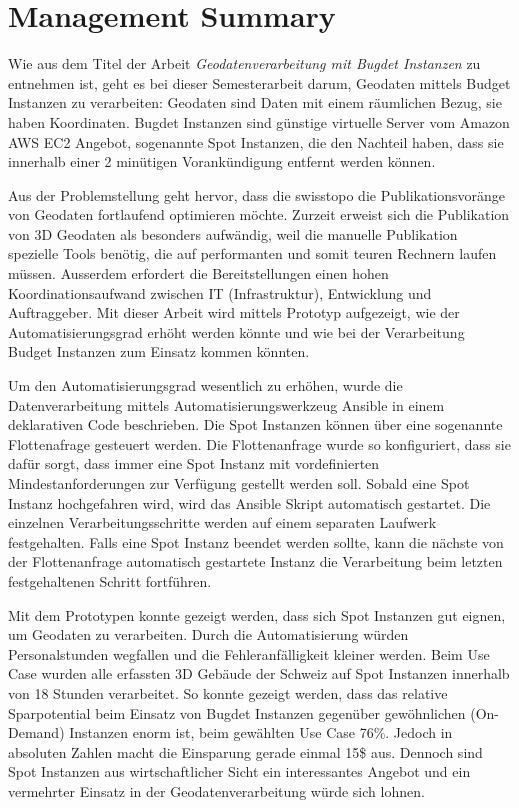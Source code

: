 \section{Management Summary}
Wie aus dem Titel der Arbeit \emph{Geodatenverarbeitung mit Bugdet Instanzen} zu entnehmen ist, geht es bei dieser Semesterarbeit darum, Geodaten mittels Budget Instanzen zu verarbeiten: Geodaten sind Daten mit einem räumlichen Bezug, sie haben Koordinaten. Bugdet Instanzen sind günstige virtuelle Server vom Amazon AWS EC2 Angebot, sogenannte Spot Instanzen, die den Nachteil haben, dass sie innerhalb einer 2 minütigen Vorankündigung entfernt werden können.

Aus der Problemstellung geht hervor, dass die swisstopo die Publikationsvoränge von Geodaten fortlaufend optimieren möchte. Zurzeit erweist sich die Publikation von 3D Geodaten als besonders aufwändig, weil die manuelle Publikation spezielle Tools benötig, die auf performanten und somit teuren Rechnern laufen müssen. Ausserdem erfordert die Bereitstellungen einen hohen Koordinationsaufwand zwischen IT (Infrastruktur), Entwicklung und Auftraggeber.
Mit dieser Arbeit wird mittels Prototyp aufgezeigt, wie der Automatisierungsgrad erhöht werden könnte und wie bei der Verarbeitung Budget Instanzen zum Einsatz kommen könnten.

Um den Automatisierungsgrad wesentlich zu erhöhen, wurde die Datenverarbeitung mittels Automatisierungswerkzeug Ansible in einem deklarativen Code beschrieben. Die Spot Instanzen können über eine sogenannte Flottenafrage gesteuert werden. Die Flottenanfrage wurde so konfiguriert, dass sie dafür sorgt, dass immer eine Spot Instanz mit vordefinierten Mindestanforderungen zur Verfügung gestellt werden soll. Sobald eine Spot Instanz hochgefahren wird, wird das Ansible Skript automatisch gestartet.
Die einzelnen Verarbeitungsschritte werden auf einem separaten Laufwerk festgehalten. Falls eine Spot Instanz beendet werden sollte, kann die nächste von der Flottenanfrage automatisch gestartete Instanz die Verarbeitung beim letzten festgehaltenen Schritt fortführen.

Mit dem Prototypen konnte gezeigt werden, dass sich Spot Instanzen gut eignen, um Geodaten zu verarbeiten. Durch die Automatisierung würden Personalstunden wegfallen und die Fehleranfälligkeit kleiner werden. Beim Use Case wurden alle erfassten 3D Gebäude der Schweiz auf Spot Instanzen innerhalb von 18 Stunden verarbeitet.
So konnte gezeigt werden, dass das relative Sparpotential beim Einsatz von Bugdet Instanzen gegenüber gewöhnlichen (On-Demand) Instanzen enorm ist, beim gewählten Use Case 76\%. Jedoch in absoluten Zahlen macht die Einsparung gerade einmal 15\$ aus. Dennoch sind Spot Instanzen aus wirtschaftlicher Sicht ein interessantes Angebot und ein vermehrter Einsatz in der Geodatenverarbeitung würde sich lohnen.


\pagebreak